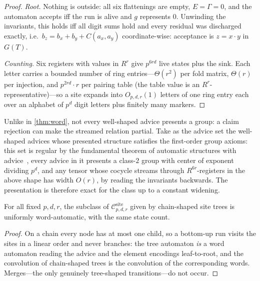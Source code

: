 \documentclass[a4paper,UKenglish,autoref,anonymous]{lipics-v2021}
\newcommand{\R}{R}                                   %
\newcommand{\site}[1]{\mathcal{C}^{\mathrm{site}}_{#1}}
\begin{document}
\begin{proof}
\emph{Root.} Nothing is outside: all six flattenings are empty, $E =
\Gamma = 0$, and the automaton accepts iff the run is alive and $g$
represents $0$. Unwinding the invariants, this holds iff all digit sums
hold and every residual was discharged exactly, i.e.\ $b_z = b_x + b_y +
C(a_x, a_y)$ coordinate-wise: acceptance is $z = x \cdot y$ in $G(T)$.

\emph{Counting.} Six registers with values in $\R^r$ give $p^{6rd}$
live states plus the sink. Each letter carries a bounded number of ring
entries---$\Theta(r^2)$ per fold matrix, $\Theta(r)$ per injection, and
$p^{2rd} \cdot r$ per pairing table (the table value is an
$\R^r$-representative)---so a site expands into $O_{p,d,r}(1)$ letters
of one ring entry each over an alphabet of $p^d$ digit letters plus
finitely many markers.
\end{proof}

\begin{remark}
\label{rem:exactness}
Unlike in \autoref{thm:word}, not every well-shaped advice presents a
group: a claim rejection can make the streamed relation partial. Take as
the advice set the well-shaped advices whose presented structure
satisfies the first-order group axioms: this set is regular by the
fundamental theorem of automatic structures with
advice~\cite{AbuZaidGraedelReinhardt2017}, every advice in it presents a
class-$2$ group with center of exponent dividing $p^d$, and any tensor
whose cocycle streams through $\R^{6r}$-registers in the above shape has
width $O(r)$, by reading the invariants backwards. The presentation is
therefore exact for the class up to a constant widening.
\end{remark}

\begin{corollary}
\label{cor:string}
For all fixed $p, d, r$, the subclass of $\site{p,d,r}$ given by
chain-shaped site trees is uniformly word-automatic, with the same state
count.
\end{corollary}

\begin{proof}
On a chain every node has at most one child, so a bottom-up run visits
the sites in a linear order and never branches: the tree automaton
\emph{is} a word automaton reading the advice and the element encodings
leaf-to-root, and the convolution of chain-shaped trees is the
convolution of the corresponding words. Merges---the only genuinely
tree-shaped transitions---do not occur.
\end{proof}
\end{document}
